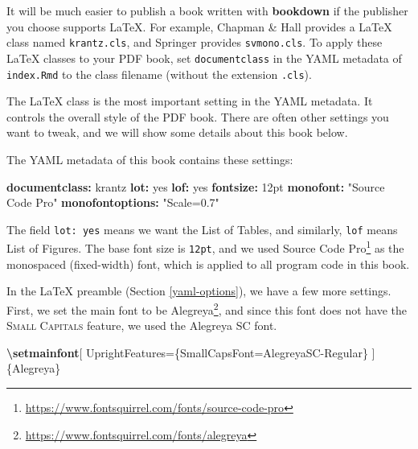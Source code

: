 \documentclass[
  12pt,
]{krantz}
\newenvironment{Shaded}{\begin{snugshade}}{\end{snugshade}}
\newcommand{\AttributeTok}[1]{\textcolor[rgb]{0.13,0.29,0.53}{#1}}
\newcommand{\CharTok}[1]{\textcolor[rgb]{0.31,0.60,0.02}{#1}}
\newcommand{\FunctionTok}[1]{\textcolor[rgb]{0.13,0.29,0.53}{\textbf{#1}}}
\newcommand{\KeywordTok}[1]{\textcolor[rgb]{0.13,0.29,0.53}{\textbf{#1}}}
\newcommand{\NormalTok}[1]{#1}
\newcommand{\StringTok}[1]{\textcolor[rgb]{0.31,0.60,0.02}{#1}}
\renewcommand{\href}[2]{#2\footnote{\url{#1}}}
\theoremstyle{definition}
\theoremstyle{definition}
\theoremstyle{definition}
\theoremstyle{definition}
\theoremstyle{remark}
\begin{document}
It will be much easier to publish a book written with \textbf{bookdown} if the publisher you choose supports LaTeX. For example, Chapman \& Hall provides a LaTeX class named \texttt{krantz.cls}, and Springer provides \texttt{svmono.cls}. To apply these LaTeX classes to your PDF book, set \texttt{documentclass} in the YAML metadata of \texttt{index.Rmd} to the class filename (without the extension \texttt{.cls}).

The LaTeX class is the most important setting in the YAML metadata. It controls the overall style of the PDF book. There are often other settings you want to tweak, and we will show some details about this book below.

The YAML metadata of this book contains these settings:

\begin{Shaded}
\begin{Highlighting}[]
\FunctionTok{documentclass}\KeywordTok{:}\AttributeTok{ krantz}
\FunctionTok{lot}\KeywordTok{:}\AttributeTok{ }\CharTok{yes}
\FunctionTok{lof}\KeywordTok{:}\AttributeTok{ }\CharTok{yes}
\FunctionTok{fontsize}\KeywordTok{:}\AttributeTok{ 12pt}
\FunctionTok{monofont}\KeywordTok{:}\AttributeTok{ }\StringTok{"Source Code Pro"}
\FunctionTok{monofontoptions}\KeywordTok{:}\AttributeTok{ }\StringTok{"Scale=0.7"}
\end{Highlighting}
\end{Shaded}

The field \texttt{lot:\ yes} means we want the List of Tables, and similarly, \texttt{lof} means List of Figures. The base font size is \texttt{12pt}, and we used \href{https://www.fontsquirrel.com/fonts/source-code-pro}{Source Code Pro} as the monospaced (fixed-width) font, which is applied to all program code in this book.

In the LaTeX preamble (Section \ref{yaml-options}), we have a few more settings. First, we set the main font to be \href{https://www.fontsquirrel.com/fonts/alegreya}{Alegreya}, and since this font does not have the \textsc{Small Capitals} feature, we used the Alegreya SC font.

\begin{Shaded}
\begin{Highlighting}[]
\FunctionTok{\textbackslash{}setmainfont}\NormalTok{[}
\NormalTok{  UprightFeatures=\{SmallCapsFont=AlegreyaSC{-}Regular\}}
\NormalTok{]\{Alegreya\}}
\end{Highlighting}
\end{Shaded}
\end{document}
